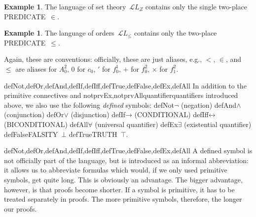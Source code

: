 \documentclass[10pt,a4paper]{article}
\newcommand*{\olup}[1]{\MakeUppercase{#1}}
\theoremstyle{plain}
\theoremstyle{definition}
\newtheorem{ex}[thm]{Example}
\theoremstyle{remark}
\newenvironment{explain}{}{}
\providecommand{\lif}{\mathbin{\rightarrow}}
\providecommand{\lforall}{\mathord{\forall}}
\providecommand{\lexists}{\mathord{\exists}}
\providecommand{\ltrue}{\top}
\providecommand{\lfalse}{\bot}
\providecommand{\Obj}{}
\providecommand{\Lang}{\ensuremath{\mathcal{L}}}
\providecommand{\iftag}[1]{#1}
\providecommand{\liff}{\mathbin{\leftrightarrow}}
\providecommand{\iftag}{}
\begin{document}
\begin{ex}
The language of set theory~$\Lang L_Z$ contains only the single
two-place \olup{predicate}~$\in$.
\end{ex}

\begin{ex}
The language of orders~$\Lang L_\le$ contains only the two-place
\olup{predicate}~$\le$.
\end{ex}

Again, these are conventions: officially, these are just aliases,
e.g., $<$, $\in$, and $\le$ are aliases for $\Obj A^2_0$, $\Obj 0$ for
$\Obj c_0$, $\prime$ for $\Obj f^1_0$, $+$ for $\Obj f^2_0$, $\times$ for
$\Obj f^2_1$.

\iftag{defNot,defOr,defAnd,defIf,defIff,defTrue,defFalse,defEx,defAll}{%
In addition to the primitive connectives and
\iftag{notprvEx,notprvAll}{quantifier}{quantifiers} introduced
above, we also use the following \emph{defined} symbols:
\startycommalist
  \iftag{defNot}{\ycomma $\lnot$ (negation)}{}%
  \iftag{defAnd}{\ycomma $\land$ (conjunction)}{}%
  \iftag{defOr}{\ycomma $\lor$ (disjunction)}{}%
  \iftag{defIf}{\ycomma $\lif$ (\olup{conditional})}{}%
  \iftag{defIff}{\ycomma $\liff$ (\olup{biconditional})}{}%
  \iftag{defAll}{\ycomma $\lforall$ (universal quantifier)}{}%
  \iftag{defEx}{\ycomma $\lexists$ (existential quantifier)}{}%
  \iftag{defFalse}{\ycomma \olup{falsity}~$\lfalse$}{}%
  \iftag{defTrue}{\ycomma \olup{truth}~$\ltrue$}}{}.

\begin{tagblock}{defNot,defOr,defAnd,defIf,defIff,defTrue,defFalse,defEx,defAll}
\begin{explain}
A defined symbol is not officially part of the language, but is
introduced as an informal abbreviation: it allows us to abbreviate
formulas which would, if we only used primitive symbols, get quite
long.  This is obviously an advantage.  The bigger advantage, however,
is that proofs become shorter.  If a symbol is primitive, it has to be
treated separately in proofs. The more primitive symbols, therefore,
the longer our proofs.
\end{explain}
\end{tagblock}

\end{document}
